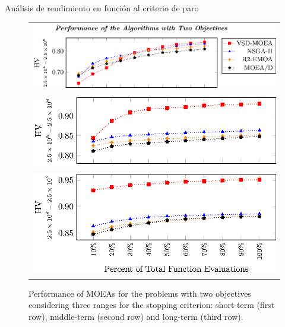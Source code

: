 \documentclass{beamer}
\begin{document}
\begin{frame}{Análisis de rendimiento en función al criterio de paro}
\begin{figure}[t]
\centering
\begin{tabular}{l}
 \includegraphics[scale=0.6]{Images/Time_tikz-figure0.eps}\\[0cm]%
 \includegraphics[scale=0.6]{Images/Time_tikz-figure1.eps}\\[0cm]%
 \includegraphics[scale=0.6]{Images/Time_tikz-figure2.eps}
\end{tabular}
\caption{\scriptsize Performance of MOEAs for the problems with two objectives considering three ranges for the stopping criterion: 
short-term (first row), middle-term (second row) and long-term (third row).}
\end{figure}
\end{frame}
\end{document}
